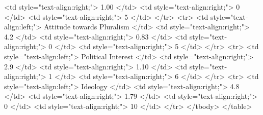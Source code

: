    <td style="text-align:right;"> 1.00 </td>
   <td style="text-align:right;"> 0 </td>
   <td style="text-align:right;"> 5 </td>
  </tr>
  <tr>
   <td style="text-align:left;"> Attitude towards Pluralism </td>
   <td style="text-align:right;"> 4.2 </td>
   <td style="text-align:right;"> 0.83 </td>
   <td style="text-align:right;"> 0 </td>
   <td style="text-align:right;"> 5 </td>
  </tr>
  <tr>
   <td style="text-align:left;"> Political Interest </td>
   <td style="text-align:right;"> 2.9 </td>
   <td style="text-align:right;"> 1.10 </td>
   <td style="text-align:right;"> 1 </td>
   <td style="text-align:right;"> 6 </td>
  </tr>
  <tr>
   <td style="text-align:left;"> Ideology </td>
   <td style="text-align:right;"> 4.8 </td>
   <td style="text-align:right;"> 1.79 </td>
   <td style="text-align:right;"> 0 </td>
   <td style="text-align:right;"> 10 </td>
  </tr>
</tbody>
</table>
